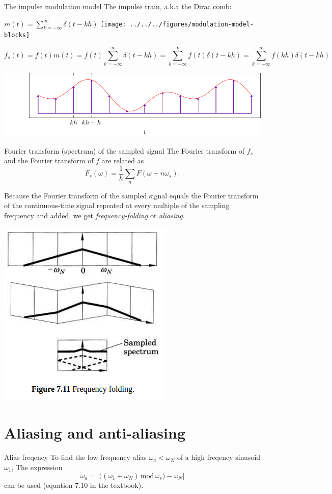 \documentclass[presentation,aspectratio=169]{beamer}
\begin{document}
\begin{frame}[label=sec-2-4]{The impulse modulation model}
The \alert{impulse train}, a.k.a the \alert{Dirac comb}:
\begin{center}
\( m(t) = \sum_{k=-\infty}^{\infty} \delta(t-kh) \)\hspace*{10mm}
 \texttt{[image: ../../../figures/modulation-model-blocks]}
\end{center}

\[f_s(t) = f(t)m(t) = f(t) \sum_{k=-\infty}^{\infty} \delta(t-kh) = \sum_{k=-\infty}^{\infty} f(t)\delta(t-kh) = \sum_{k=-\infty}^{\infty} f(kh) \delta(t-kh) \]


\begin{center}
\includegraphics[width=0.8\linewidth]{../../figures/modulation-model-timeseries}
\end{center}
\end{frame}

\begin{frame}[label=sec-2-5]{Fourier transform (spectrum) of the sampled signal}
The Fourier transform of $f_s$ and the Fourier transform of $f$ are related as
\[ F_s(\omega) = \frac{1}{h} \sum_n F(\omega + n\omega_s). \]

Because the Fourier transform of the sampled signal equals the Fourier transform of the continuous-time signal repeated at every multiple of the sampling frequency and added, we get \emph{frequency-folding} or \emph{aliasing}.

\begin{center}
\includegraphics[width=0.28\linewidth]{../../figures/frequency-folding.png}
\end{center}
\end{frame}

\section{Aliasing and anti-aliasing}
\label{sec-3}
\begin{frame}[label=sec-3-1]{Alias freqency}
To find the low frequency alias \(\omega_a<\omega_N\) of a high freqency sinusoid \(\omega_1\), The expression 
\[ \omega_a = \left| \big( (\omega_1 + \omega_N) \, \text{mod}\, \omega_s\big) - \omega_N\right|\] 
can be used (equation 7.10 in the textbook).
\end{frame}
\end{document}
